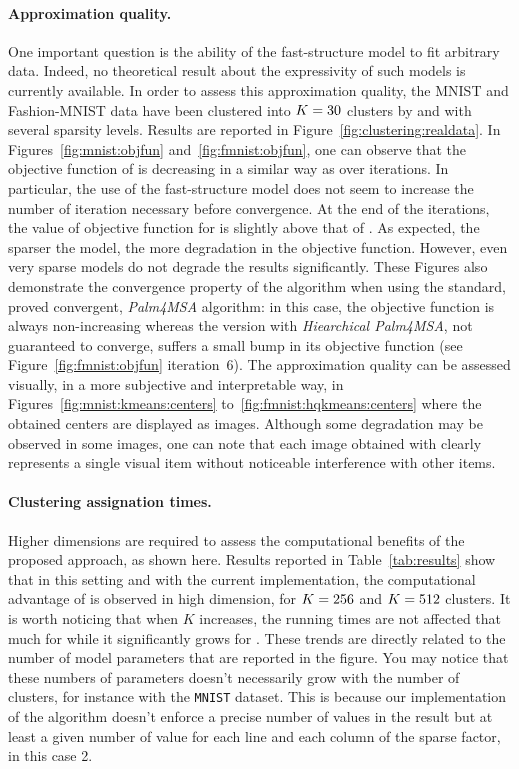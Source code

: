 \paragraph{Approximation quality.} One important question is the ability of the fast-structure model to fit arbitrary data.
Indeed, no theoretical result about the expressivity of such models is currently available.
In order to assess this approximation quality, the MNIST and Fashion-MNIST data have been clustered into $K=30$ clusters by \kmeans and \qkmeans with several sparsity levels.
Results are reported in Figure~\ref{fig:clustering:realdata}.
In Figures~\ref{fig:mnist:objfun} and~\ref{fig:fmnist:objfun}, one can observe that the objective function of \qkmeans is decreasing in a similar way as \kmeans over iterations.
In particular, the use of the fast-structure model does not seem to increase the number of iteration necessary before convergence.
At the end of the iterations, the value of objective function for \qkmeans is slightly above that of \kmeans.
As expected, the sparser the model, the more degradation in the objective function.
However, even very sparse models do not degrade the results significantly. These Figures also demonstrate the convergence property of the \qkmeans algorithm when using the standard, proved convergent, \textit{Palm4MSA} algorithm: in this case, the objective function is always non-increasing whereas the \qkmeans version with \textit{Hiearchical Palm4MSA}, not guaranteed to converge, suffers a small bump in its objective function (see Figure~\ref{fig:fmnist:objfun} iteration~6).
The approximation quality can be assessed visually, in a more subjective and interpretable way, in Figures~\ref{fig:mnist:kmeans:centers} to~\ref{fig:fmnist:hqkmeans:centers} where the obtained centers are displayed as images.
Although some degradation may be observed in some images, one can note that each image obtained with \qkmeans clearly represents a single visual item without noticeable interference with other items.

\paragraph{Clustering assignation times.}
Higher dimensions are required to assess the computational benefits of the proposed approach, as shown here.
Results reported in Table~\ref{tab:results} show that in this setting and with the current implementation, the computational advantage of \qkmeans is observed in high dimension, for $K=256$ and $K=512$ clusters. It is worth noticing that when $K$ increases, the running times are not affected that much for \qkmeans while it significantly grows for \kmeans. These trends are directly related to the number of model parameters that are reported in the figure. You may notice that these numbers of parameters doesn't necessarily grow with the number of clusters, for instance with the \texttt{MNIST} dataset. This is because our implementation of the \palm algorithm doesn't enforce a precise number of values in the result but at least a given number of value for each line and each column of the sparse factor, in this case 2.


